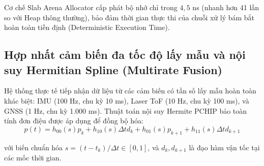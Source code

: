 \begin{table}[H]
\centering
\caption{Ước lượng lý thuyết hiệu năng cấp phát và mức độ phân mảnh giữa cơ chế Heap tiêu chuẩn và Slab Arena Allocator}
\label{tab:slab-arena-allocator-performance}
\end{table}

Cơ chế Slab Arena Allocator cấp phát bộ nhớ chỉ trong $4{,}5$ ns (nhanh hơn 41 lần so với Heap thông thường), bảo đảm thời gian thực thi của chuỗi xử lý bám bắt hoàn toàn tiền định (Deterministic Execution Time).

\subsection{Hợp nhất cảm biến đa tốc độ lấy mẫu và nội suy Hermitian Spline (Multirate Fusion)}

\hspace{0.5cm} Hệ thống thực tế tiếp nhận dữ liệu từ các cảm biến có tần số lấy mẫu hoàn toàn khác biệt: IMU (100 Hz, chu kỳ 10 ms), Laser ToF (10 Hz, chu kỳ 100 ms), và GNSS (1 Hz, chu kỳ 1.000 ms). Thuật toán nội suy Hermite PCHIP bảo toàn tính đơn điệu được áp dụng để đồng bộ hóa:
\begin{equation}
p(t) = h_{00}(s) p_k + h_{10}(s) \Delta t d_k + h_{01}(s) p_{k+1} + h_{11}(s) \Delta t d_{k+1}
\label{eq:pchip-hermite-interpolation-formula}
\end{equation}

với biến chuẩn hóa $s = (t - t_k)/\Delta t \in [0, 1]$, và $d_k, d_{k+1}$ là đạo hàm vận tốc tại các mốc thời gian.

